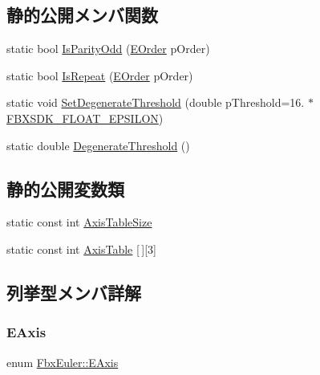 \subsection*{静的公開メンバ関数}
\begin{DoxyCompactItemize}
\item 
static bool \hyperlink{class_fbx_euler_a7eabb69ba7eadc7b0b025eccee605648}{Is\+Parity\+Odd} (\hyperlink{class_fbx_euler_a7d5bec7eedb022b4dae56894ab7a9939}{E\+Order} p\+Order)
\item 
static bool \hyperlink{class_fbx_euler_a6f668dbfcefeee76a9668aafd3b53e45}{Is\+Repeat} (\hyperlink{class_fbx_euler_a7d5bec7eedb022b4dae56894ab7a9939}{E\+Order} p\+Order)
\item 
static void \hyperlink{class_fbx_euler_aea5f70a2534b0f5353a97aec02d9bafc}{Set\+Degenerate\+Threshold} (double p\+Threshold=16. $\ast$\hyperlink{fbxtypes_8h_a11f9f828046657bad7afc23f591f2052}{F\+B\+X\+S\+D\+K\+\_\+\+F\+L\+O\+A\+T\+\_\+\+E\+P\+S\+I\+L\+ON})
\item 
static double \hyperlink{class_fbx_euler_a4bc8faf22d9ab4ee1d6b45d3ab45d86a}{Degenerate\+Threshold} ()
\end{DoxyCompactItemize}
\subsection*{静的公開変数類}
\begin{DoxyCompactItemize}
\item 
static const int \hyperlink{class_fbx_euler_aa7c81e68be87ae5c26810eba96ede9ba}{Axis\+Table\+Size}
\item 
static const int \hyperlink{class_fbx_euler_aa75edcd96f3a7432c31b09869051635d}{Axis\+Table} \mbox{[}$\,$\mbox{]}\mbox{[}3\mbox{]}
\end{DoxyCompactItemize}


\subsection{列挙型メンバ詳解}
\mbox{\label{class_fbx_euler_ad021726fa17836ca3efd353ebc538f1a}} 
\subsubsection{\texorpdfstring{E\+Axis}{EAxis}}
{\footnotesize\ttfamily enum \hyperlink{class_fbx_euler_ad021726fa17836ca3efd353ebc538f1a}{Fbx\+Euler\+::\+E\+Axis}}

